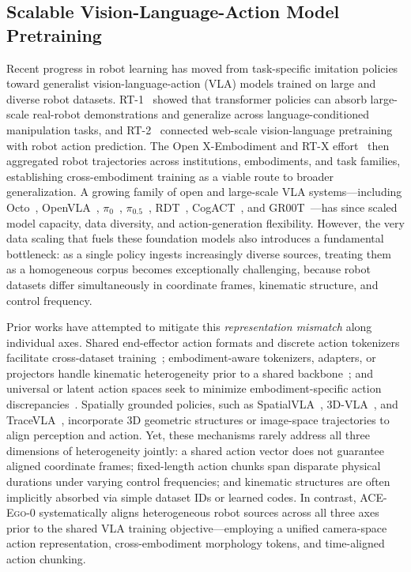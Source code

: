 \documentclass{llmxive}
\providecommand{\OURS}{\textsc{ACE-Ego-0}\xspace}
\providecommand{\Ours}{\OURS}
\begin{document}
\subsection{Scalable Vision-Language-Action Model Pretraining}
Recent progress in robot learning has moved from task-specific imitation policies toward generalist vision-language-action (VLA) models trained on large and diverse robot datasets.
RT-1~\cite{brohan2023rt} showed that transformer policies can absorb large-scale real-robot demonstrations and generalize across language-conditioned manipulation tasks, and RT-2~\cite{zitkovich2023rt} connected web-scale vision-language pretraining with robot action prediction. 
The Open X-Embodiment and RT-X effort~\cite{o2024open} then aggregated robot trajectories across institutions, embodiments, and task families, establishing cross-embodiment training as a viable route to broader generalization.  
A growing family of open and large-scale VLA systems---including Octo~\cite{octo_2023}, OpenVLA~\cite{kim2025openvla}, $\pi_0$~\cite{BlackK-RSS-25}, $\pi_{0.5}$~\cite{pmlr-v305-black25a}, RDT~\cite{liu2025rdt}, CogACT~\cite{li2024cogact}, and GR00T~\cite{bjorck2025gr00t}---has since scaled model capacity, data diversity, and action-generation flexibility.
However, the very data scaling that fuels these foundation models also introduces a fundamental bottleneck: as a single policy ingests increasingly diverse sources, treating them as a homogeneous corpus becomes exceptionally challenging, because robot datasets differ simultaneously in coordinate frames, kinematic structure, and control frequency.

Prior works have attempted to mitigate this \emph{representation mismatch} along individual axes. Shared end-effector action formats and discrete action tokenizers facilitate cross-dataset training~\cite{o2024open,kim2025openvla}; embodiment-aware tokenizers, adapters, or projectors handle kinematic heterogeneity prior to a shared backbone~\cite{wang2024hpt,bjorck2025gr00t}; and universal or latent action spaces seek to minimize embodiment-specific action discrepancies~\cite{zheng2025uniact,ye2025lapa,liu2026rdt2}. Spatially grounded policies, such as SpatialVLA~\cite{qu2025spatialvla}, 3D-VLA~\cite{zhen2024threedvla}, and TraceVLA~\cite{zheng2024tracevla}, incorporate 3D geometric structures or image-space trajectories to align perception and action. 
Yet, these mechanisms rarely address all three dimensions of heterogeneity jointly: a shared action vector does not guarantee aligned coordinate frames; fixed-length action chunks span disparate physical durations under varying control frequencies; and kinematic structures are often implicitly absorbed via simple dataset IDs or learned codes. 
In contrast, \Ours systematically aligns heterogeneous robot sources across all three axes prior to the shared VLA training objective---employing a unified camera-space action representation, cross-embodiment morphology tokens, and time-aligned action chunking.
\end{document}
